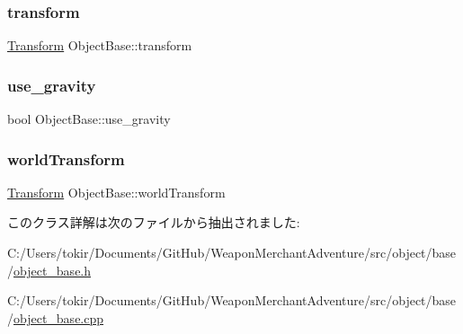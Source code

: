 \mbox{\label{class_object_base_ac8096c26fe09682da6119208d392dc62}} 
\subsubsection{\texorpdfstring{transform}{transform}}
{\footnotesize\ttfamily \mbox{\hyperlink{class_transform}{Transform}} Object\+Base\+::transform}

\mbox{\label{class_object_base_aab135a2a04e76046804f01b63df4f35c}} 
\subsubsection{\texorpdfstring{use\+\_\+gravity}{use\_gravity}}
{\footnotesize\ttfamily bool Object\+Base\+::use\+\_\+gravity}

\mbox{\label{class_object_base_abedc2ea4baa694611f8822ea6e04b210}} 
\subsubsection{\texorpdfstring{world\+Transform}{worldTransform}}
{\footnotesize\ttfamily \mbox{\hyperlink{class_transform}{Transform}} Object\+Base\+::world\+Transform\hspace{0.3cm}{\ttfamily [protected]}}



このクラス詳解は次のファイルから抽出されました\+:\begin{DoxyCompactItemize}
\item 
C\+:/\+Users/tokir/\+Documents/\+Git\+Hub/\+Weapon\+Merchant\+Adventure/src/object/base/\mbox{\hyperlink{object__base_8h}{object\+\_\+base.\+h}}\item 
C\+:/\+Users/tokir/\+Documents/\+Git\+Hub/\+Weapon\+Merchant\+Adventure/src/object/base/\mbox{\hyperlink{object__base_8cpp}{object\+\_\+base.\+cpp}}\end{DoxyCompactItemize}

